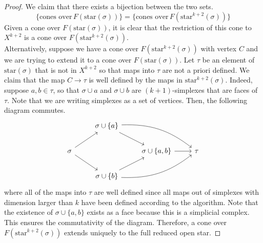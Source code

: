 \documentclass{article}
\theoremstyle{definition}
\begin{document}
\begin{proof}
We claim that there exists a bijection between the two sets.
\begin{equation}
	\{\textrm{cones over} \, F(\mathrm{star}(\sigma))\} = \{\textrm{cones over} \, F(\mathrm{star}^{k+2}(\sigma))\}
\end{equation}
Given a cone over $F(\mathrm{star}(\sigma))$, it is clear that the restriction of this cone to $X^{k+2}$ is a cone over $F(\mathrm{star}^{k+2}(\sigma))$. \\

Alternatively, suppose we have a cone over $F(\mathrm{star}^{k+2}(\sigma))$ with vertex $C$ and we are trying to extend it to a cone over $F(\mathrm{star}(\sigma))$. Let $\tau$ be an element of $\mathrm{star}(\sigma)$ that is not in $X^{k+2}$ so that maps into $\tau$ are not a priori defined. We claim that the map $C \rightarrow \tau$ is well defined by the maps in $\mathrm{star}^{k+2}(\sigma)$. Indeed, suppose $a,b \in \tau$, so that $\sigma\cup a$ and $\sigma \cup b$ are $(k+1)$-simplexes that are faces of $\tau$. Note that we are writing simplexes as a set of vertices. Then, the following diagram commutes.
\[
\begin{tikzcd}
 & \sigma \cup \{a\} \arrow{dr} \arrow[bend left=20]{drr} & & \\
 \sigma \arrow{ur} \arrow{dr} & & \sigma\cup\{a,b\} \arrow{r} & \tau \\
 & \sigma \cup \{b\} \arrow{ur} \arrow[bend right=20]{urr} & &
\end{tikzcd}
\]
where all of the maps into $\tau$ are well defined since all maps out of simplexes with dimension larger than $k$ have been defined according to the algorithm. Note that the existence of $\sigma \cup \{a,b\}$ exists as a face because this is a simplicial complex. This ensures the commutativity of the diagram. Therefore, a cone over $F(\mathrm{star}^{k+2}(\sigma))$ extends uniquely to the full reduced open star.

\end{proof}
\end{document}
